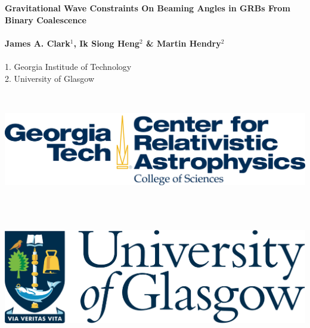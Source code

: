 \documentclass[a0,landscape]{a0poster}
\begin{document}


\begin{minipage}[b]{0.7\linewidth}
\veryHuge \color{NavyBlue} \textbf{Gravitational Wave Constraints On Beaming
    Angles in GRBs From Binary Coalescence} \color{Black}\\ \\%
\huge \textbf{James A. Clark$^{1}$, Ik Siong Heng$^{2}$ \& Martin
Hendry$^{2}$}\\ \\%
\large 1. Georgia Institude of Technology\\ %
\large 2. University of Glasgow\\ %
\end{minipage}
%
\hspace{10cm}
%
\begin{minipage}[b]{0.2\linewidth}
\includegraphics[height=5cm]{cra.png} \\ \\%
\includegraphics[height=5cm]{uni_glasgow_logo.png} \\ \\%
\end{minipage}
\end{document}
